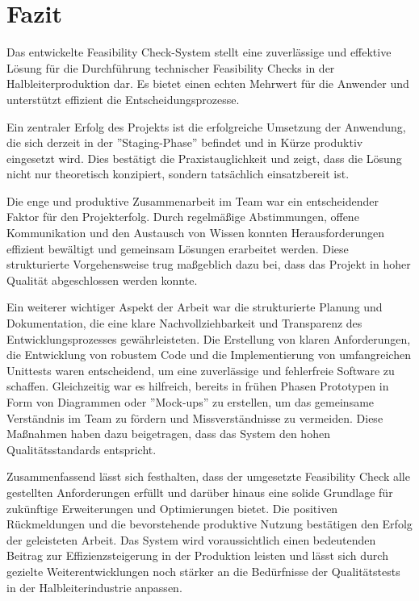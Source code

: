\chapter{Fazit}

Das entwickelte Feasibility Check-System stellt eine zuverlässige und effektive Lösung für die Durchführung technischer Feasibility Checks in der Halbleiterproduktion dar. Es bietet einen echten Mehrwert für die Anwender und unterstützt effizient die Entscheidungsprozesse.

Ein zentraler Erfolg des Projekts ist die erfolgreiche Umsetzung der Anwendung, die sich derzeit in der ''Staging-Phase'' befindet und in Kürze produktiv eingesetzt wird. Dies bestätigt die Praxistauglichkeit und zeigt, dass die Lösung nicht nur theoretisch konzipiert, sondern tatsächlich einsatzbereit ist.

Die enge und produktive Zusammenarbeit im Team war ein entscheidender Faktor für den Projekterfolg. Durch regelmäßige Abstimmungen, offene Kommunikation und den Austausch von Wissen konnten Herausforderungen effizient bewältigt und gemeinsam Lösungen erarbeitet werden. Diese strukturierte Vorgehensweise trug maßgeblich dazu bei, dass das Projekt in hoher Qualität abgeschlossen werden konnte.

Ein weiterer wichtiger Aspekt der Arbeit war die strukturierte Planung und Dokumentation, die eine klare Nachvollziehbarkeit und Transparenz des Entwicklungsprozesses gewährleisteten. Die Erstellung von klaren Anforderungen, die Entwicklung von robustem Code und die Implementierung von umfangreichen Unittests waren entscheidend, um eine zuverlässige und fehlerfreie Software zu schaffen. Gleichzeitig war es hilfreich, bereits in frühen Phasen Prototypen in Form von Diagrammen oder ''Mock-ups'' zu erstellen, um das gemeinsame Verständnis im Team zu fördern und Missverständnisse zu vermeiden. Diese Maßnahmen haben dazu beigetragen, dass das System den hohen Qualitätsstandards entspricht.

Zusammenfassend lässt sich festhalten, dass der umgesetzte Feasibility Check alle gestellten Anforderungen erfüllt und darüber hinaus eine solide Grundlage für zukünftige Erweiterungen und Optimierungen bietet. Die positiven Rückmeldungen und die bevorstehende produktive Nutzung bestätigen den Erfolg der geleisteten Arbeit. Das System wird voraussichtlich einen bedeutenden Beitrag zur Effizienzsteigerung in der Produktion leisten und lässt sich durch gezielte Weiterentwicklungen noch stärker an die Bedürfnisse der Qualitätstests in der Halbleiterindustrie anpassen.




